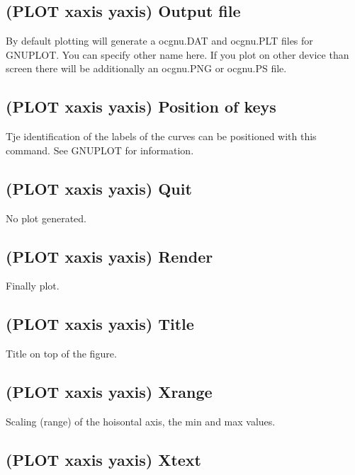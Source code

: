 \documentclass[12pt]{article}
\begin{document}
\subsection{(PLOT xaxis yaxis) Output file}

By default plotting will generate a ocgnu.DAT and ocgnu.PLT files for
GNUPLOT.  You can specify other name here.  If you plot on other
device than screen there will be additionally an ocgnu.PNG or ocgnu.PS
file.

\subsection{(PLOT xaxis yaxis) Position of keys}

Tje identification of the labels of the curves can be positioned
with this command.  See GNUPLOT for information.

\subsection{(PLOT xaxis yaxis) Quit}

No plot generated.

\subsection{(PLOT xaxis yaxis) Render}

Finally plot.

\subsection{(PLOT xaxis yaxis) Title}

Title on top of the figure.

\subsection{(PLOT xaxis yaxis) Xrange}

Scaling (range) of the hoisontal axis, the min and max values.

\subsection{(PLOT xaxis yaxis) Xtext}
\end{document}
